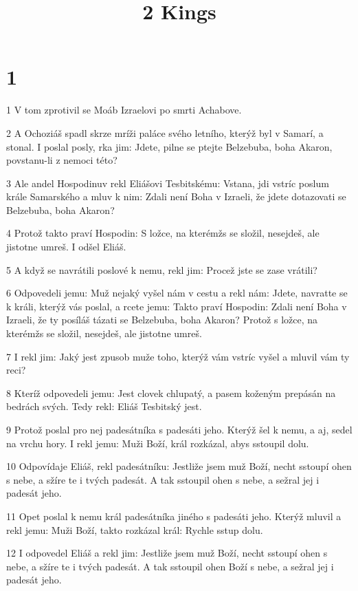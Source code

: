 

\title{2 Kings}

\chapter{1}

\par 1 V tom zprotivil se Moáb Izraelovi po smrti Achabove.
\par 2 A Ochoziáš spadl skrze mríži paláce svého letního, kterýž byl v Samarí, a stonal. I poslal posly, rka jim: Jdete, pilne se ptejte Belzebuba, boha Akaron, povstanu-li z nemoci této?
\par 3 Ale andel Hospodinuv rekl Eliášovi Tesbitskému: Vstana, jdi vstríc poslum krále Samarského a mluv k nim: Zdali není Boha v Izraeli, že jdete dotazovati se Belzebuba, boha Akaron?
\par 4 Protož takto praví Hospodin: S ložce, na kterémžs se složil, nesejdeš, ale jistotne umreš. I odšel Eliáš.
\par 5 A když se navrátili poslové k nemu, rekl jim: Procež jste se zase vrátili?
\par 6 Odpovedeli jemu: Muž nejaký vyšel nám v cestu a rekl nám: Jdete, navratte se k králi, kterýž vás poslal, a rcete jemu: Takto praví Hospodin: Zdali není Boha v Izraeli, že ty posíláš tázati se Belzebuba, boha Akaron? Protož s ložce, na kterémžs se složil, nesejdeš, ale jistotne umreš.
\par 7 I rekl jim: Jaký jest zpusob muže toho, kterýž vám vstríc vyšel a mluvil vám ty reci?
\par 8 Kteríž odpovedeli jemu: Jest clovek chlupatý, a pasem koženým prepásán na bedrách svých. Tedy rekl: Eliáš Tesbitský jest.
\par 9 Protož poslal pro nej padesátníka s padesáti jeho. Kterýž šel k nemu, a aj, sedel na vrchu hory. I rekl jemu: Muži Boží, král rozkázal, abys sstoupil dolu.
\par 10 Odpovídaje Eliáš, rekl padesátníku: Jestliže jsem muž Boží, necht sstoupí ohen s nebe, a sžíre te i tvých padesát. A tak sstoupil ohen s nebe, a sežral jej i padesát jeho.
\par 11 Opet poslal k nemu král padesátníka jiného s padesáti jeho. Kterýž mluvil a rekl jemu: Muži Boží, takto rozkázal král: Rychle sstup dolu.
\par 12 I odpovedel Eliáš a rekl jim: Jestliže jsem muž Boží, necht sstoupí ohen s nebe, a sžíre te i tvých padesát. A tak sstoupil ohen Boží s nebe, a sežral jej i padesát jeho.

